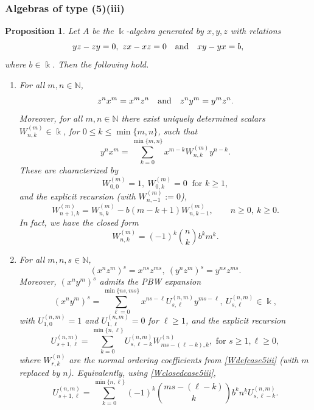 \documentclass{amsart}
\newtheorem{proposition}[theorem]{Proposition}
\theoremstyle{definition}
\theoremstyle{remark}
\numberwithin{equation}{section}
\begin{document}
\subsubsection{Algebras of type (5)(iii)}

\begin{proposition}\label{Case(5)(iii)}
Let $A$ be the $\Bbbk$-algebra generated by $x,y,z$ with relations
\[
yz-zy=0,\ zx-xz=0 \quad {\rm and} \quad xy-yx=b,
\]
where $b\in\Bbbk$. Then the following hold.

\begin{enumerate}
\item [\rm (1)] For all $m,n\in\mathbb N$,
\[
z^n x^m = x^m z^n \quad {\rm and} \quad z^n y^m = y^m z^n.
\]
Moreover, for all $m,n\in\mathbb N$ there exist uniquely determined scalars
$W^{(m)}_{n,k}\in\Bbbk$, for $0\le k\le \min\{m,n\}$, such that
\begin{equation}\label{Wdefcase5iii}
y^n x^m=\sum_{k=0}^{\min\{m,n\}} x^{m-k}W^{(m)}_{n,k} y^{n-k}.
\end{equation}
These are characterized by
\[
W^{(m)}_{0,0}=1,\ W^{(m)}_{0,k}=0\ \text{ for } k\ge 1,
\]
and the explicit recursion {\rm (}with $W^{(m)}_{n,-1}:=0${\rm )}, 
\begin{equation}\label{Wreccase5iii}
W^{(m)}_{n+1,k}=W^{(m)}_{n,k}-b (m-k+1) W^{(m)}_{n,k-1},
\qquad n\ge 0,\ k\ge 0.
\end{equation}
In fact, we have the closed form
\begin{equation}\label{Wclosedcase5iii}
W^{(m)}_{n,k}=(-1)^k\binom{n}{k} b^{k} m^{\underline{k}}.
\end{equation}

\item [\rm (2)] For all $m,n,s\in\mathbb N$,
\[
(x^n z^m)^s=x^{ns}z^{ms},\ (y^n z^m)^s=y^{ns}z^{ms}.
\]
Moreover, $(x^n y^m)^s$ admits the PBW expansion
\begin{equation}\label{Udefcase5iii}
(x^n y^m)^s=\sum_{\ell=0}^{\min\{ns,ms\}} x^{ns-\ell} U^{(n,m)}_{s,\ell} y^{ms-\ell}, \ U^{(n,m)}_{s,\ell}\in\Bbbk,
\end{equation}
with $U^{(n,m)}_{1,0}=1$ and $U^{(n,m)}_{1,\ell}=0$ for $\ell\ge 1$, and the explicit recursion
\begin{equation}\label{Ureccase5iii}
U^{(n,m)}_{s+1,\ell}=\sum_{k=0}^{\min\{n,\ell\}}
U^{(n,m)}_{s,\ell-k} W^{(n)}_{ms-(\ell-k), k}, \text{ for }  s\ge 1, \ell\ge 0,
\end{equation}
where $W^{(n)}_{r,k}$ are the normal ordering coefficients from \eqref{Wdefcase5iii} {\rm (}with $m$ replaced by $n${\rm )}. Equivalently, using \eqref{Wclosedcase5iii},
\begin{equation}\label{Urecclosedcase5iii}
U^{(n,m)}_{s+1,\ell}=\sum_{k=0}^{\min\{n,\ell\}}(-1)^k\binom{ms-(\ell-k)}{k} b^{k} n^{\underline{k}} U^{(n,m)}_{s,\ell-k}.
\end{equation}


\end{enumerate}
\end{proposition}
\end{document}
